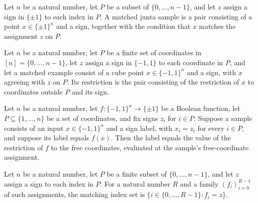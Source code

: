 \begin{definition}
\label{FABL.MatchedJuntaExample}
\leanok
{}
Let $n$ be a natural number, let $P$ be a subset of $\{0,\ldots,n-1\}$, and let $z$
assign a sign in $\{\pm1\}$ to each index in $P$. A matched junta sample is a pair
consisting of a point $x\in\{\pm1\}^n$ and a sign, together with the condition that $x$
matches the assignment $z$ on $P$.
\end{definition}

\begin{definition}
\label{FABL.matchedJuntaRestrictionExample}
\leanok
{}
Let $n$ be a natural number, let $P$ be a finite set of coordinates in
$[n]=\{0,\ldots,n-1\}$, let $z$ assign a sign in $\{-1,1\}$ to each coordinate in $P$,
and let a matched example consist of a cube point $x\in\{-1,1\}^n$ and a sign, with $x$
agreeing with $z$ on $P$. Its restriction is the pair consisting of the restriction of
$x$ to coordinates outside $P$ and its sign.
\end{definition}

\begin{theorem}
\label{FABL.matchedJuntaRestrictionExample_label}
\leanok
{}
Let $n$ be a natural number, let $f:\{-1,1\}^n\to\{\pm1\}$ be a Boolean function,
let $P\subseteq\{1,\ldots,n\}$ be a set of coordinates, and fix signs $z_i$ for
$i\in P$. Suppose a sample consists of an input $x\in\{-1,1\}^n$ and a sign label,
with $x_i=z_i$ for every $i\in P$, and suppose its label equals $f(x)$. Then the label
equals the value of the restriction of $f$ to the free coordinates, evaluated at the
sample's free-coordinate assignment.
\end{theorem}

\begin{definition}
\label{FABL.fixedMatchingIndices}
\leanok
{}
Let $n$ be a natural number, let $P$ be a finite subset of $\{0,\ldots,n-1\}$, and let
$z$ assign a sign to each index in $P$. For a natural number $R$ and a family
$(f_i)_{i=0}^{R-1}$ of such assignments, the matching index set is
$\{i\in\{0,\ldots,R-1\}: f_i=z\}$.
\end{definition}

